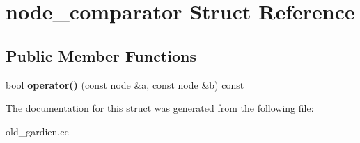 \hypertarget{structnode__comparator}{}\section{node\+\_\+comparator Struct Reference}
\label{structnode__comparator}
\subsection*{Public Member Functions}
\begin{DoxyCompactItemize}
\item 
\mbox{\label{structnode__comparator_a66452bb9395d8d2da7b07408aa5b81bb}} 
bool {\bfseries operator()} (const \hyperlink{structnode}{node} \&a, const \hyperlink{structnode}{node} \&b) const
\end{DoxyCompactItemize}


The documentation for this struct was generated from the following file\+:\begin{DoxyCompactItemize}
\item 
old\+\_\+gardien.\+cc\end{DoxyCompactItemize}
